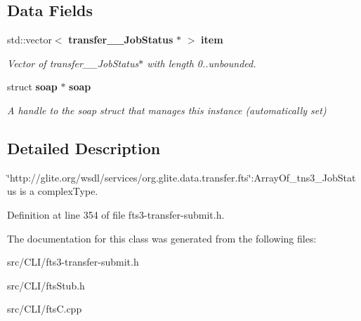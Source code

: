\subsection*{Data Fields}
\begin{DoxyCompactItemize}
\item 
std::vector$<$ {\bf transfer\_\-\_\-JobStatus} $\ast$ $>$ {\bf item}\label{classfts____ArrayOf__USCOREtns3__USCOREJobStatus_abc280821153d48e00c3da771d8bb6a50}

\begin{DoxyCompactList}\small\item\em Vector of transfer\_\-\_\-JobStatus$\ast$ with length 0..unbounded. \item\end{DoxyCompactList}\item 
struct {\bf soap} $\ast$ {\bf soap}\label{classfts____ArrayOf__USCOREtns3__USCOREJobStatus_a17de4ed584c97539d841721c00ef6051}

\begin{DoxyCompactList}\small\item\em A handle to the soap struct that manages this instance (automatically set) \item\end{DoxyCompactList}\end{DoxyCompactItemize}


\subsection{Detailed Description}
\char`\"{}http://glite.org/wsdl/services/org.glite.data.transfer.fts\char`\"{}:ArrayOf\_\-tns3\_\-JobStatus is a complexType. 

Definition at line 354 of file fts3-\/transfer-\/submit.h.



The documentation for this class was generated from the following files:\begin{DoxyCompactItemize}
\item 
src/CLI/fts3-\/transfer-\/submit.h\item 
src/CLI/ftsStub.h\item 
src/CLI/ftsC.cpp\end{DoxyCompactItemize}
